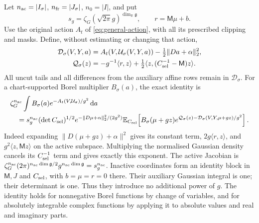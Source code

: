 \documentclass[11pt,reqno]{amsart}
\numberwithin{equation}{section}
\theoremstyle{definition}
\theoremstyle{remark}
\newcommand{\R}{\mathbb R}
\newcommand{\dd}{\mathrm d}
\newcommand{\g}{\mathfrak g}
\begin{document}
Let \(n_{\rm ac}=|I_\sigma|\), \(n_{\rm fr}=|J_\sigma|\),
\(n_0=|I|\), and put
\[
 s_g=\zeta_G(\sqrt{2\pi}g)^{\dim_\R\g},\qquad
 r=\mathsf M\mu+b.
\]
Use the original action \(A_t\) of \eqref{eq:general-action},
with all its prescribed clipping and masks. Define, without
estimating or changing that action,
\begin{align}
 \mathcal D_\sigma(V,Y,a)
       &=A_t(V,\mathcal U_\sigma(V,Y,a))
                                      -\tfrac12\|Da+\alpha\|_2^2,
 \label{eq:physical-selected-exact-phase}\\
 \mathcal Q_\sigma(z)
       &=-g^{-1}\langle r,z\rangle
               +\tfrac12\langle z,(C_{\rm sel}^{-1}-\mathsf M)z\rangle.
 \label{eq:physical-selected-density-correction}
\end{align}
All uncut tails and all differences from the auxiliary affine
rows remain in \(\mathcal D_\sigma\).
For a chart-supported Borel multiplier \(B_\sigma(a)\),
the exact identity is
\begin{align}
 &\zeta_G^{n_{\rm ac}}\int B_\sigma(a)
                 e^{-A_t(V,\mathcal U_\sigma)/g^2}\,\dd a\notag\\
 &\quad=s_g^{n_{\rm ac}}(\det C_{\rm sel})^{1/2}
      e^{-\|D\mu+\alpha\|_2^2/(2g^2)}
       \mathbb E_{C_{\rm sel}}\!\left[
       B_\sigma(\mu+gz)e^{\mathcal Q_\sigma(z)
                  -\mathcal D_\sigma(V,Y,\mu+gz)/g^2}\right].
 \label{eq:physical-selected-exact-identity}
\end{align}
Indeed expanding \(\|D(\mu+gz)+\alpha\|^2\) gives its constant
term, \(2g\langle r,z\rangle\), and
\(g^2\langle z,\mathsf Mz\rangle\) on the active subspace.
Multiplying the normalised Gaussian density cancels its
\(C_{\rm sel}^{-1}\) term and gives exactly this exponent.
The active Jacobian is
\(\zeta_G^{n_{\rm ac}}(2\pi)^{n_{\rm ac}\dim\g/2}
g^{n_{\rm ac}\dim\g}=s_g^{n_{\rm ac}}\).
Inactive coordinates form an identity block in \(\mathsf M,J\)
and \(C_{\rm sel}\), with \(b=\mu=r=0\) there. Their auxiliary
Gaussian integral is one; their determinant is one. Thus they
introduce no additional power of \(g\).
The identity holds for nonnegative Borel functions by change of
variables, and for absolutely integrable complex functions by
applying it to absolute values and real and imaginary parts.
\end{document}
